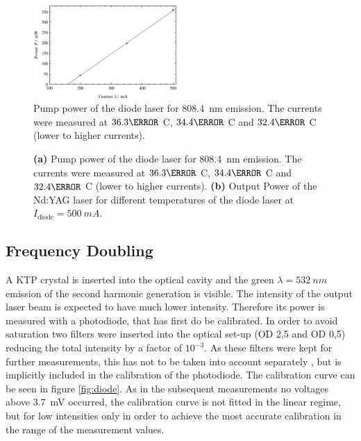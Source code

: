 \documentclass[a4paper]{scrartcl}
\numberwithin{equation}{section}
\numberwithin{figure}{section}
\numberwithin{table}{section}
\begin{document}
\begin{figure}
\centering
\includegraphics[width=0.485\textwidth]{img/PvsI808.pdf}
\caption{ \small  Pump power of the diode laser for \SI{808.4}{nm} emission. The currents were measured at $36.3 \degree$ C, $34.4 \degree$ C and $32.4 \degree$ C (lower to higher currents). }
\label{fig:cal}
\end{figure}

\begin{figure}
\centering
\hfill
{}
\caption{\small \textbf{(a)} Pump power of the diode laser for \SI{808.4}{nm} emission. The currents were measured at $36.3 \degree$ C, $34.4 \degree$ C and $32.4 \degree$ C (lower to higher currents). \textbf{(b)} Output Power of the Nd:YAG laser for different temperatures of the diode laser at $I_\text{diode}=\SI{500}{mA}$.}
\label{fig:power}
\end{figure}



\subsection{Frequency Doubling}
A KTP crystal is inserted into the optical cavity and the green $\lambda =\SI{532}{nm}$ emission of the second harmonic generation is visible. The intensity of the output laser beam is expected to have much lower intensity. Therefore its power is measured with a photodiode, that has first do be calibrated. In order to avoid saturation two filters were inserted into the optical set-up (OD 2,5 and OD 0,5) reducing the total intensity by a factor of $10^{-3}$. As these filters were kept for further measurements, this has not to be taken into account separately , but is implicitly included in the calibration of the photodiode. The calibration curve can be seen in figure \ref{fig:diode}. As in the subsequent measurements no voltages above \SI{3.7}{mV} occurred, the calibration curve is not fitted in the linear regime, but for low intensities only in order to achieve the most accurate calibration in the range of the measurement values.
\end{document}
